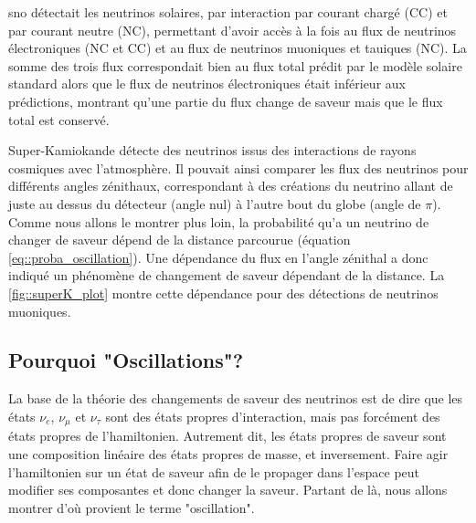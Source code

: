       \gls{sno} détectait les neutrinos solaires, par interaction par courant chargé (CC) et par courant neutre (NC), permettant d'avoir accès à la fois au flux de neutrinos électroniques (NC et CC) et au flux de neutrinos muoniques et tauiques (NC). La somme des trois flux correspondait bien au flux total prédit par le modèle solaire standard alors que le flux de neutrinos électroniques était inférieur aux prédictions, montrant qu'une partie du flux change de saveur mais que le flux total est conservé.

      Super-Kamiokande détecte des neutrinos issus des interactions de rayons cosmiques avec l'atmosphère. Il pouvait ainsi comparer les flux des neutrinos pour différents angles zénithaux, correspondant à des créations du neutrino allant de juste au dessus du détecteur (angle nul) à l'autre bout du globe (angle de $\pi$). Comme nous allons le montrer plus loin, la probabilité qu'a un neutrino de changer de saveur dépend de la distance parcourue (équation \eqref{eq::proba_oscillation}). Une dépendance du flux en l'angle zénithal a donc indiqué un phénomène de changement de saveur dépendant de la distance. La \autoref{fig::superK_plot} montre cette dépendance pour des détections de neutrinos muoniques.

    \subsection{Pourquoi "Oscillations"?}\label{sec::oscillations}
      La base de la théorie des changements de saveur des neutrinos est de dire que les états $\nu_e$, $\nu_{\mu}$ et $\nu_{\tau}$ sont des états propres d'interaction, mais pas forcément des états propres de l'hamiltonien. Autrement dit, les états propres de saveur sont une composition linéaire des états propres de masse, et inversement. Faire agir l'hamiltonien sur un état de saveur afin de le propager dans l'espace peut modifier ses composantes et donc changer la saveur. Partant de là, nous allons montrer d'où provient le terme "oscillation".

